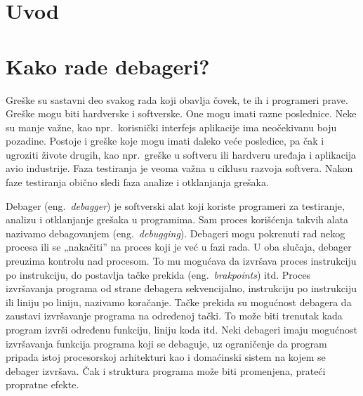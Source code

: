 \documentclass[12pt,oneside]{memoir}
\begin{document}
\frontmatter
\naslovna
\komisija
\tableofcontents*

\mainmatter

\chapter{Uvod}


\chapter{Kako rade debageri?}
\label{chp:debageri}

Greške su sastavni deo svakog rada koji obavlja čovek, te ih i programeri prave. Greške mogu biti hardverske i softverske. One mogu imati razne poslednice. Neke su manje važne, kao npr.~korisnički interfejs aplikacije ima neočekivanu boju pozadine. Postoje i greške koje mogu imati daleko veće posledice, pa čak i ugroziti živote drugih, kao npr.~greške u softveru ili hardveru uređaja i aplikacija avio industrije. Faza testiranja je veoma važna u ciklusu razvoja softvera. Nakon faze testiranja obično sledi faza analize i otklanjanja grešaka.

Debager (eng.~\emph{debagger}) je softverski alat koji koriste programeri za testiranje, analizu i otklanjanje grešaka u programima. Sam proces korišćenja takvih alata nazivamo debagovanjem (eng.~\emph{debugging}).
Debageri mogu pokrenuti rad nekog procesa ili se „nakačiti” na proces koji je već u fazi rada. U oba slučaja, debager preuzima kontrolu nad procesom. To mu mogućava da izvršava proces instrukciju po instrukciju, do postavlja tačke prekida (eng.~\emph{brakpoints}) itd. Proces izvršavanja programa od strane debagera sekvencijalno, instrukciju po instrukciju ili liniju po liniju, nazivamo koračanje. Tačke prekida su mogućnost debagera da zaustavi izvršavanje programa na određenoj tački. To može biti trenutak kada program izvrši određenu funkciju, liniju koda itd. Neki debageri imaju mogućnost izvršavanja funkcija programa koji se debaguje, uz ograničenje da program pripada istoj procesorskoj arhitekturi kao i domaćinski sistem na kojem se debager izvršava. Čak i struktura programa može biti promenjena, prateći propratne efekte.
\end{document}
